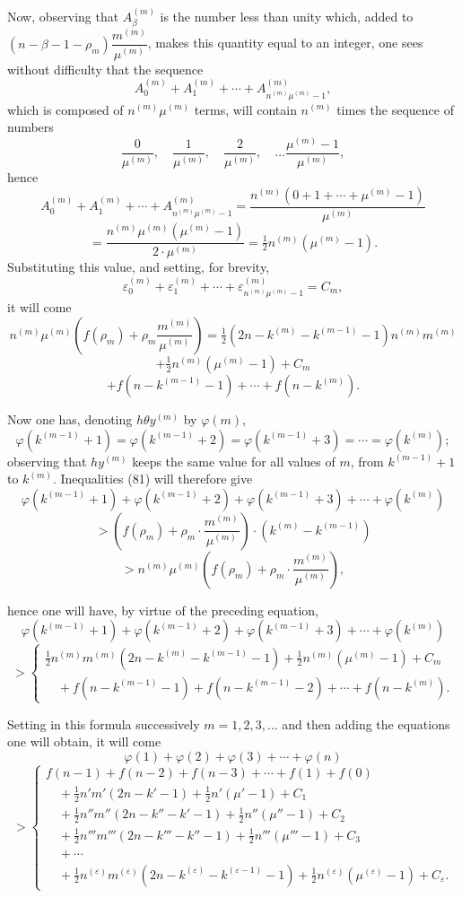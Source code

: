 \documentclass{article}
\begin{document}
Now, observing that $A_\beta^{(m)}$ is the number less than unity which, added to $(n-\beta-1-\rho_m)\dfrac{m^{(m)}}{\mu^{(m)}}$, makes this quantity equal to an integer, one sees without difficulty that the sequence
\[ A_0^{(m)} + A_1^{(m)} + \cdots + A_{n^{(m)}\mu^{(m)}-1}^{(m)}, \]
which is composed of $n^{(m)}\mu^{(m)}$ terms, will contain $n^{(m)}$ times the sequence of numbers
\[ \frac{0}{\mu^{(m)}}, \quad \frac{1}{\mu^{(m)}}, \quad \frac{2}{\mu^{(m)}}, \quad \ldots \frac{\mu^{(m)}-1}{\mu^{(m)}}, \]
hence
\[ A_0^{(m)}+A_1^{(m)}+\cdots+A_{n^{(m)}\mu^{(m)}-1}^{(m)} = \frac{n^{(m)}(0+1+\cdots+\mu^{(m)}-1)}{\mu^{(m)}} \]
\[ = \frac{n^{(m)}\mu^{(m)}(\mu^{(m)}-1)}{2 \cdot \mu^{(m)}} = \tfrac{1}{2}n^{(m)}(\mu^{(m)}-1). \tag{85} \]
Substituting this value, and setting, for brevity,
\[ \varepsilon_0^{(m)}+\varepsilon_1^{(m)}+\cdots+\varepsilon_{n^{(m)}\mu^{(m)}-1}^{(m)} = C_m, \]
it will come
\[ n^{(m)}\mu^{(m)}\left(f(\rho_m)+\rho_m\frac{m^{(m)}}{\mu^{(m)}}\right) = \tfrac{1}{2}(2n-k^{(m)}-k^{(m-1)}-1)n^{(m)}m^{(m)} \]
\[ + \tfrac{1}{2}n^{(m)}(\mu^{(m)}-1) + C_m \]
\[ + f(n-k^{(m-1)}-1)+\cdots+f(n-k^{(m)}). \tag{86} \]

Now one has, denoting $h\theta y^{(m)}$ by $\varphi(m)$,
\[ \varphi(k^{(m-1)}+1) = \varphi(k^{(m-1)}+2) = \varphi(k^{(m-1)}+3) = \cdots = \varphi(k^{(m)}); \tag{87} \]
observing that $hy^{(m)}$ keeps the same value for all values of $m$, from $k^{(m-1)}+1$ to $k^{(m)}$. Inequalities (81) will therefore give
\[ \varphi(k^{(m-1)}+1)+\varphi(k^{(m-1)}+2)+\varphi(k^{(m-1)}+3)+\cdots+\varphi(k^{(m)}) \]
\[ > \left(f(\rho_m)+\rho_m \cdot \frac{m^{(m)}}{\mu^{(m)}}\right) \cdot (k^{(m)}-k^{(m-1)}) \]
\[ > n^{(m)}\mu^{(m)}\left(f(\rho_m)+\rho_m \cdot \frac{m^{(m)}}{\mu^{(m)}}\right), \]

hence one will have, by virtue of the preceding equation,
\[ \varphi(k^{(m-1)}+1)+\varphi(k^{(m-1)}+2)+\varphi(k^{(m-1)}+3)+\cdots+\varphi(k^{(m)}) \]
\[ > \begin{cases} \tfrac{1}{2}n^{(m)}m^{(m)}(2n-k^{(m)}-k^{(m-1)}-1) + \tfrac{1}{2}n^{(m)}(\mu^{(m)}-1) + C_m \\ \quad + f(n-k^{(m-1)}-1)+f(n-k^{(m-1)}-2)+\cdots+f(n-k^{(m)}). \end{cases} \]

Setting in this formula successively $m = 1, 2, 3, \ldots$ and then adding the equations one will obtain, it will come
\[ \varphi(1) + \varphi(2) + \varphi(3) + \cdots + \varphi(n) \]
\[ > \begin{cases}
f(n-1)+f(n-2)+f(n-3)+\cdots+f(1)+f(0) \\
\quad + \tfrac{1}{2}n'm'(2n-k'-1) + \tfrac{1}{2}n'(\mu'-1) + C_1 \\
\quad + \tfrac{1}{2}n''m''(2n-k''-k'-1) + \tfrac{1}{2}n''(\mu''-1) + C_2 \\
\quad + \tfrac{1}{2}n'''m'''(2n-k'''-k''-1) + \tfrac{1}{2}n'''(\mu'''-1) + C_3 \\
\quad + \cdots \\
\quad + \tfrac{1}{2}n^{(\varepsilon)}m^{(\varepsilon)}(2n-k^{(\varepsilon)}-k^{(\varepsilon-1)}-1) + \tfrac{1}{2}n^{(\varepsilon)}(\mu^{(\varepsilon)}-1) + C_\varepsilon.
\end{cases} \]
\end{document}
